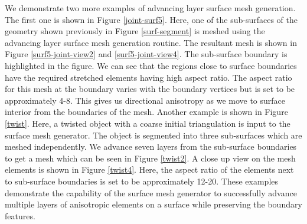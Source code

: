 \documentclass[conf]{new-aiaa}
\begin{document}
We demonstrate two more examples of advancing layer surface mesh generation. The first one is shown in Figure \ref{joint-surf5}. Here, one of the sub-surfaces of the geometry shown previously in Figure \ref{surf-segment} is meshed using the advancing layer surface mesh generation routine. The resultant mesh is shown in Figure \ref{surf5-joint-view2} and \ref{surf5-joint-view4}. The sub-surface boundary is highlighted in the figure. We can see that the regions close to surface boundaries have the required stretched elements having high aspect ratio. The aspect ratio for this mesh at the boundary varies with the boundary vertices but is set to be approximately 4-8. This gives us directional anisotropy as we move to surface interior from the boundaries of the mesh. Another example is shown in Figure \ref{twist}. Here, a twisted object with a coarse initial triangulation is input to the surface mesh generator. The object is segmented into three sub-surfaces which are meshed independently. We advance seven layers from the sub-surface boundaries to get a mesh which can be seen in Figure \ref{twist2}. A close up view on the mesh elements is shown in Figure \ref{twist4}. Here, the aspect ratio of the elements next to sub-surface boundaries is set to be approximately 12-20. These examples demonstrate the capability of the surface mesh generator to successfully advance multiple layers of anisotropic elements on a surface while preserving the boundary features.
\end{document}
